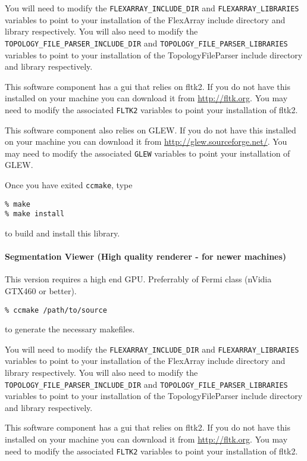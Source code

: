 You will need to modify the 
\texttt{FLEXARRAY\_INCLUDE\_DIR} and \texttt{FLEXARRAY\_LIBRARIES} variables to point
to your installation of the FlexArray include directory and library respectively.
You will also need to modify the \texttt{TOPOLOGY\_FILE\_PARSER\_INCLUDE\_DIR} and 
\texttt{TOPOLOGY\_FILE\_PARSER\_LIBRARIES} variables to point to your installation of the 
TopologyFileParser include directory and library respectively.

This software component has a gui that relies on fltk2.  If you do not have this installed
on your machine you can download it from \url{http://fltk.org}.  You may need to modify the associated 
\texttt{FLTK2} variables to point your installation of fltk2.

This software component also relies on GLEW.  If you do not have this installed
on your machine you can download it from \url{http://glew.sourceforge.net/}.  You may need to 
modify the associated \texttt{GLEW} variables to point your installation of GLEW.

Once you have exited \texttt{ccmake}, type 

\texttt{\% make}\\
\texttt{\% make install}

to build and install this library.
 
\paragraph{Segmentation Viewer (High quality renderer - for newer machines)} 
This version requires a high end GPU. Preferrably of Fermi class (nVidia GTX460 or better).

\texttt{\% ccmake /path/to/source}

to generate the necessary makefiles. 

You will need to modify the 
\texttt{FLEXARRAY\_INCLUDE\_DIR} and \texttt{FLEXARRAY\_LIBRARIES} variables to point
to your installation of the FlexArray include directory and library respectively.
You will also need to modify the \texttt{TOPOLOGY\_FILE\_PARSER\_INCLUDE\_DIR} and 
\texttt{TOPOLOGY\_FILE\_PARSER\_LIBRARIES} variables to point to your installation of the 
TopologyFileParser include directory and library respectively.

This software component has a gui that relies on fltk2.  If you do not have this installed
on your machine you can download it from \url{http://fltk.org}.  You may need to modify the associated 
\texttt{FLTK2} variables to point your installation of fltk2.

